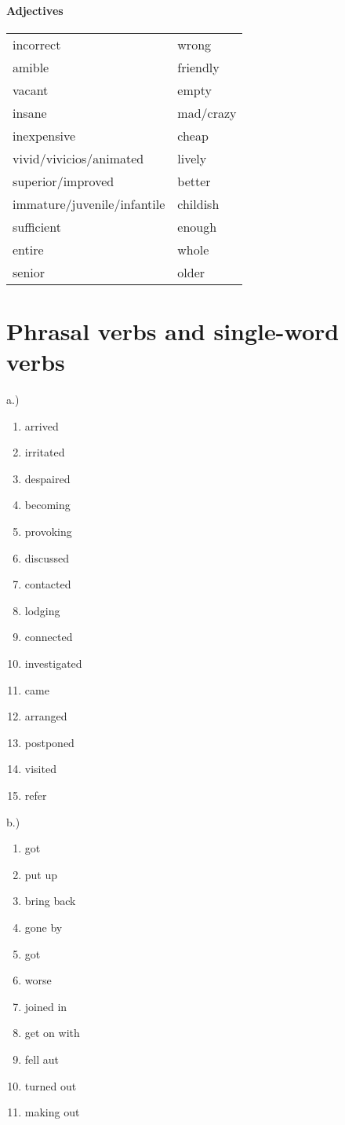\paragraph{Adjectives}
\begin{tabular}{l l}
incorrect & wrong\\
amible & friendly\\
vacant & empty\\
insane & mad/crazy\\
inexpensive & cheap\\
vivid/vivicios/animated & lively\\
superior/improved & better\\
immature/juvenile/infantile & childish\\
sufficient & enough\\
entire & whole\\
senior & older
\end{tabular}

\section{Phrasal verbs and single-word verbs}
a.)
\begin{enumerate}
\item arrived
\item irritated
\item despaired
\item becoming
\item provoking
\item discussed
\item contacted
\item lodging
\item connected
\item investigated
\item came
\item arranged
\item postponed
\item visited
\item refer
\end{enumerate}
b.)
\begin{enumerate}
\item got
\item put up
\item bring back
\item gone by
\item got
\item worse
\item joined in
\item get on with
\item fell aut
\item turned out
\item making out
\end{enumerate}


